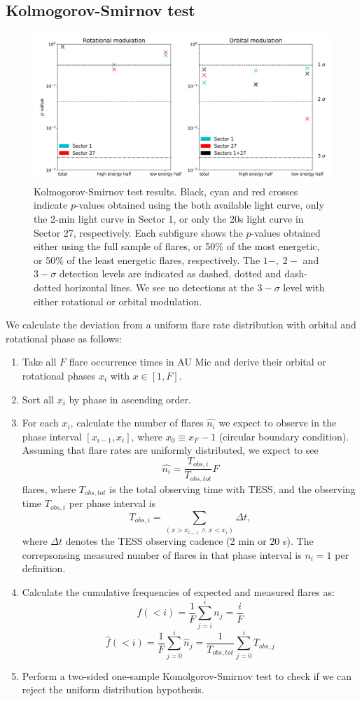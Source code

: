 \documentclass[fleqn,usenatbib,letters]{mnras}%
\begin{document}
\subsection{Kolmogorov-Smirnov test}
\label{sec:phases}
\begin{figure}
\includegraphics[width=\hsize]{figures/2021_05_AUMic_KStests_meta.png} 
\caption{Kolmogorov-Smirnov test results. Black, cyan and red crosses indicate $p$-values obtained using the both available light curve, only the 2-min light curve in Sector 1, or only the 20s light curve in Sector 27, respectively. Each subfigure shows the $p$-values obtained either using the full sample of flares, or 50\% of the most energetic, or 50\% of the least energetic flares, respectively. The $1-,\;2-$ and $3-\sigma$ detection levels are indicated as dashed, dotted and dash-dotted horizontal lines. We see no detections at the $3-\sigma$ level with either rotational or orbital modulation.}
\label{fig:kstests}
\end{figure}
We calculate the deviation from a uniform flare rate distribution with orbital and rotational phase as follows:
\begin{enumerate}
\item Take all $F$ flare occurrence times in AU Mic and derive their orbital or rotational phases $x_i$ with $x \in [1,F]$. 
\item Sort all $x_i$ by phase in ascending order.
\item For each $x_i$, calculate the number of flares $\hat{n_i}$ we expect to observe in the phase interval $[x_{i-1}, x_i]$, where $x_0\equiv x_F - 1$ (circular boundary condition). Assuming that flare rates are uniformly distributed, we expect to see
$$\hat{n_i} = \dfrac{T_{obs,i}}{T_{obs, tot}} F$$
flares, where $T_{obs, tot}$ is the total observing time with TESS, and the observing time $T_{obs,i}$ per phase interval is
$$T_{obs,i}=\displaystyle\sum_{(x>x_{i-1}\, \land \, x<x_i)} \Delta t,$$
where $\Delta t$ denotes the TESS observing cadence (2 min or 20 s). The correpsonsing measured number of flares in that phase interval is $n_i=1$ per definition.
\item Calculate the cumulative frequencies of expected and measured flares as:
$$f(<i) = \dfrac{1}{F}\displaystyle\sum_{j=i}^{i}n_j= \dfrac{i}{F}$$
$$\hat{f}(<i) =  \dfrac{1}{F}\displaystyle\sum_{j=0}^{i}\hat{n}_j = \dfrac{1}{T_{obs,tot}}\displaystyle\sum_{j=0}^{i}T_{obs,j}$$
\item Perform a two-sided one-sample Komolgorov-Smirnov test to check if we can reject the uniform distribution hypothesis.
\end{enumerate}
\end{document}
